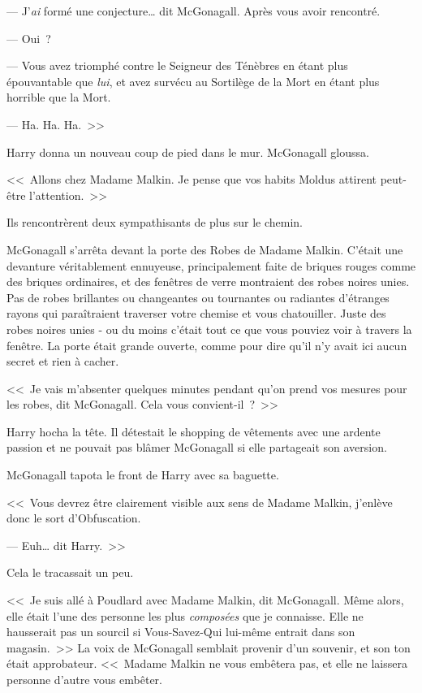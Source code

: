 --- J'\emph{ai} formé une conjecture… dit McGonagall. Après vous avoir rencontré.

--- Oui~?

--- Vous avez triomphé contre le Seigneur des Ténèbres en étant plus épouvantable que \emph{lui}, et avez survécu au Sortilège de la Mort en étant plus horrible que la Mort.

--- Ha. Ha. Ha.~>>

Harry donna un nouveau coup de pied dans le mur. McGonagall gloussa.

<<~Allons chez Madame Malkin. Je pense que vos habits Moldus attirent peut-être l'attention.~>>

Ils rencontrèrent deux sympathisants de plus sur le chemin.

McGonagall s'arrêta devant la porte des Robes de Madame Malkin. C'était une devanture véritablement ennuyeuse, principalement faite de briques rouges comme des briques ordinaires, et des fenêtres de verre montraient des robes noires unies. Pas de robes brillantes ou changeantes ou tournantes ou radiantes d'étranges rayons qui paraîtraient traverser votre chemise et vous chatouiller. Juste des robes noires unies - ou du moins c'était tout ce que vous pouviez voir à travers la fenêtre. La porte était grande ouverte, comme pour dire qu'il n'y avait ici aucun secret et rien à cacher.

<<~Je vais m'absenter quelques minutes pendant qu'on prend vos mesures pour les robes, dit McGonagall. Cela vous convient-il~?~>>

Harry hocha la tête. Il détestait le shopping de vêtements avec une ardente passion et ne pouvait pas blâmer McGonagall si elle partageait son aversion.

McGonagall tapota le front de Harry avec sa baguette.

<<~Vous devrez être clairement visible aux sens de Madame Malkin, j'enlève donc le sort d'Obfuscation.

--- Euh… dit Harry.~>>

Cela le tracassait un peu.

<<~Je suis allé à Poudlard avec Madame Malkin, dit McGonagall. Même alors, elle était l'une des personne les plus \emph{composées} que je connaisse. Elle ne hausserait pas un sourcil si Vous-Savez-Qui lui-même entrait dans son magasin.~>> La voix de McGonagall semblait provenir d'un souvenir, et son ton était approbateur. <<~Madame Malkin ne vous embêtera pas, et elle ne laissera personne d'autre vous embêter.

